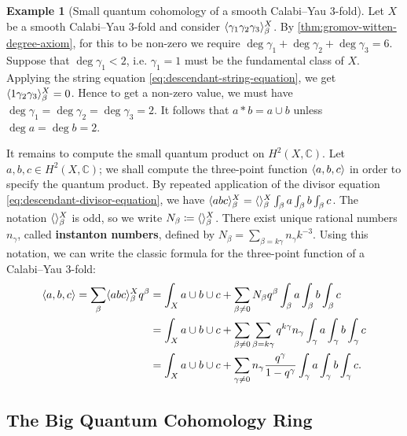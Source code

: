 \documentclass{report}
\theoremstyle{plain}
\theoremstyle{definition}
\newtheorem{example}[theorem]{Example}
\theoremstyle{remark}
\newcommand{\bC}{\mathbb{C}}
\DeclarePairedDelimiter{\inner}{\langle}{\rangle}
\begin{document}
\begin{example}[Small quantum cohomology of a smooth Calabi--Yau $3$-fold] \label{ex:small-quantum-cohomology-calabi-yau-threefold}
  Let $X$ be a smooth Calabi--Yau $3$-fold and consider
  $\inner{\gamma_1\gamma_2\gamma_3}_\beta^X$. By
  \ref{thm:gromov-witten-degree-axiom}, for this to be non-zero we
  require $\deg \gamma_1 + \deg \gamma_2 + \deg \gamma_3 = 6$. Suppose
  that $\deg \gamma_1 < 2$, i.e. $\gamma_1 = 1$ must be the
  fundamental class of $X$. Applying the string equation
  \eqref{eq:descendant-string-equation}, we get
  $\inner{1\gamma_2\gamma_3}_\beta^X = 0$. Hence to get a non-zero
  value, we must have $\deg \gamma_1 = \deg \gamma_2 = \deg \gamma_3 =
  2$. It follows that $a * b = a \cup b$ unless $\deg a = \deg b = 2$.

  It remains to compute the small quantum product on $H^2(X, \bC)$.
  Let $a, b, c \in H^2(X, \bC)$; we shall compute the three-point
  function $\inner{a,b,c}$ in order to specify the quantum product. By
  repeated application of the divisor equation
  \eqref{eq:descendant-divisor-equation}, we have $\inner{abc}_\beta^X
  = \inner{}_\beta^X \int_\beta a \int_\beta b \int_\beta c$. The
  notation $\inner{}_\beta^X$ is odd, so we write $N_\beta \coloneqq
  \inner{}_\beta^X$. There exist unique rational numbers $n_\gamma$,
  called {\bf instanton numbers}, defined by $N_\beta = \sum_{\beta =
    k\gamma} n_\gamma k^{-3}$. Using this notation, we can write the
  classic formula for the three-point function of a Calabi--Yau
  $3$-fold:
  \begin{equation} \label{eq:calabi-yau-threefold-three-point-function}
  \begin{aligned}
    \inner{a,b,c} = \sum_\beta \inner{abc}_\beta^X q^\beta
    &= \int_X a \cup b \cup c + \sum_{\beta \neq 0} N_\beta q^\beta \int_\beta a \int_\beta b \int_\beta c \\
    &= \int_X a \cup b \cup c + \sum_{\beta \neq 0} \sum_{\beta = k\gamma} q^{k\gamma} n_\gamma \int_\gamma a \int_\gamma b \int_\gamma c \\
    &= \int_X a \cup b \cup c + \sum_{\gamma \neq 0} n_\gamma \frac{q^\gamma}{1 - q^\gamma} \int_\gamma a \int_\gamma b \int_\gamma c.
  \end{aligned}
  \end{equation}
\end{example}

\subsection{The Big Quantum Cohomology Ring}
\end{document}
